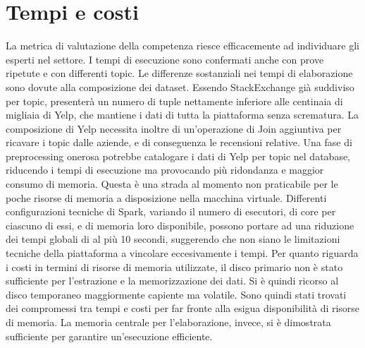 \section{Tempi e costi}
La metrica di valutazione della competenza riesce efficacemente ad individuare gli esperti nel settore. I tempi di esecuzione sono confermati anche con prove ripetute e con differenti topic. Le differenze sostanziali nei tempi di elaborazione sono dovute alla composizione dei dataset. Essendo StackExchange già suddiviso per topic, presenterà un numero di tuple nettamente inferiore alle centinaia di migliaia di Yelp, che mantiene i dati di tutta la piattaforma senza scrematura. La composizione di Yelp necessita inoltre di un'operazione di Join aggiuntiva per ricavare i topic dalle aziende, e di conseguenza le recensioni relative. Una fase di preprocessing onerosa potrebbe catalogare i dati di Yelp per topic nel database, riducendo i tempi di esecuzione ma provocando più ridondanza e maggior consumo di memoria. Questa è una strada al momento non praticabile per le poche risorse di memoria a disposizione nella macchina virtuale. Differenti configurazioni tecniche di Spark, variando il numero di esecutori, di core per ciascuno di essi, e di memoria loro disponibile, possono portare ad una riduzione dei tempi globali di al più 10 secondi, suggerendo che non siano le limitazioni tecniche della piattaforma a vincolare eccesivamente i tempi. Per quanto riguarda i costi in termini di risorse di memoria utilizzate, il disco primario non è stato sufficiente per l'estrazione e la memorizzazione dei dati. Si è quindi ricorso al disco temporaneo maggiormente capiente ma volatile. Sono quindi stati trovati dei compromessi tra tempi e costi per far fronte alla esigua disponibilità di risorse di memoria. La memoria centrale per l'elaborazione, invece, si è dimostrata sufficiente per garantire un'esecuzione efficiente.